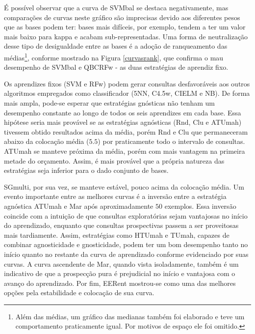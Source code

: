 É possível observar que a curva de SVMbal se destaca negativamente,
mas comparações de curvas neste gráfico são imprecisas devido aos diferentes
pesos que as bases podem ter:
bases mais difíceis, por exemplo, tendem a ter um valor mais baixo para kappa e acabam
sub-representadas.
Uma forma de neutralização desse tipo de desigualdade entre as bases é a adoção
de ranqueamento das médias\footnote{Além das médias,
um gráfico das medianas também foi elaborado e teve um comportamento praticamente igual.
Por motivos de espaço ele foi omitido.}, conforme mostrado na Figura \ref{curvasrank},
que confirma o mau desempenho de SVMbal e QBCRFw - as duas estratégias de aprendiz fixo.

Os aprendizes fixos (SVM e RFw) podem gerar consultas desfavoráveis aos outros algoritmos
empregados como classificador (5NN, C4.5w, CIELM e NB).
De forma mais ampla, pode-se esperar que estratégias gnósticas não tenham um desempenho
constante ao longo de todos os seis aprendizes em cada base.
Essa hipótese seria mais provável se as estratégias agnósticas (Rnd, Clu e ATUmah) tivessem obtido
resultados acima da média, porém Rnd e Clu que permaneceram
abaixo da colocação média ($5.5$) por praticamente todo o intervalo de consultas.
ATUmah se manteve próxima da média, porém com mais vantagem na primeira metade do orçamento.
Assim, é mais provável que a própria natureza das estratégias seja inferior para o dado conjunto de bases.

SGmulti, por sua vez, se manteve estável, pouco acima da colocação média.
Um evento importante entre as melhores curvas é a inversão entre a estratégia agnóstica
ATUmah e Mar após aproximadamente $50$ exemplos.
Essa inversão coincide com a intuição de que consultas exploratórias sejam vantajosas no início do
aprendizado, enquanto que consultas prospectivas passem a ser proveitosas mais tardiamente.
Assim, estratégias como HTUmah e TUmah, capazes de combinar agnosticidade e gnosticidade,
podem ter um bom desempenho tanto no início quanto no restante da curva de aprendizado
conforme evidenciado por suas curvas.
A curva ascendente de Mar, quando vista isoladamente, também é um indicativo de que a prospecção pura
é prejudicial no início e vantajosa com o avanço do aprendizado.
Por fim, EERent mostrou-se como uma das melhores opções pela estabilidade e colocação de sua curva.

